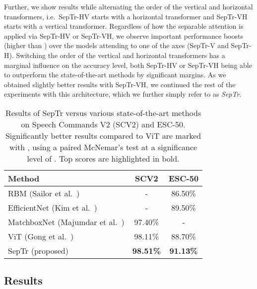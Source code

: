 \documentclass[a4paper]{article}
\begin{document}
Further, we show results while alternating the order of the vertical and horizontal transformers, i.e.~SepTr-HV starts with a horizontal transformer and SepTr-VH starts with a vertical transformer. Regardless of how the separable attention is applied via SepTr-HV or SepTr-VH, we observe important performance boosts (higher than ) over the models attending to one of the axes (SepTr-V and SepTr-H). Switching the order of the vertical and horizontal transformers has a marginal influence on the accuracy level, both SepTr-HV or SepTr-VH being able to outperform the state-of-the-art methods by significant margins. As we obtained slightly better results with SepTr-VH, we continued the rest of the experiments with this architecture, which we further simply refer to as \emph{SepTr}.

\begin{table}[!t]
\caption{Results of SepTr versus various state-of-the-art methods on Speech Commands V2 (SCV2) and ESC-50. Significantly better results compared to ViT \cite{Gong-INTERSPEECH-2021} are marked with , using a paired McNemar's test \cite{Dietterich-NC-1998} at a significance level of . Top scores are highlighted in bold.}
\label{tab_results_2}
\setlength\tabcolsep{4.0pt}  
\vspace{-0.2cm}
\centering
\begin{tabular}{l c c}
\toprule
{\textbf{Method}} & \textbf{SCV2} & {\textbf{ESC-50}}\\
\midrule
RBM (Sailor et al.~\cite{Sailor-INTERSPEECH-2017})  & - &  86.50\% \\
EfficientNet (Kim et al.~\cite{Kim-DCASE-2020}) & - & 89.50\% \\
MatchboxNet (Majumdar et al.~\cite{Majumdar-INTERSPEECH-2020}) & 97.40\% & - \\
ViT (Gong et al.~\cite{Gong-INTERSPEECH-2021}) & 98.11\% & 88.70\% \\
\midrule
SepTr (proposed)         & \textbf{98.51\%} & \textbf{91.13\%}\\
\bottomrule
\end{tabular}
\vspace{-0.1cm}
\end{table}

\subsection{Results}
\end{document}

